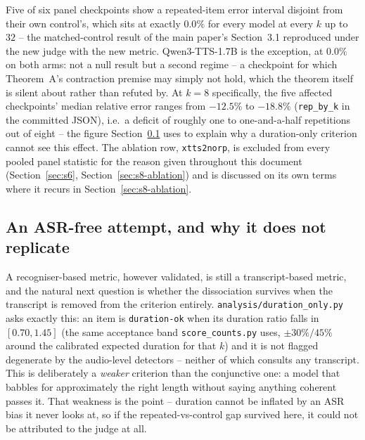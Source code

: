 \documentclass[11pt]{article}
\begin{document}
Five of six panel checkpoints show a repeated-item error interval disjoint
from their own control's, which sits at exactly $0.0\%$ for every model at
every $k$ up to $32$ -- the matched-control result of the main paper's
Section~3.1 reproduced under the new judge with the new metric. Qwen3-TTS-1.7B
is the exception, at $0.0\%$ on both arms: not a null result but a second
regime -- a checkpoint for which
Theorem~A's contraction premise may simply not hold, which the theorem
itself is silent about rather than refuted by. At $k{=}8$ specifically, the
five affected checkpoints' median relative error ranges from $-12.5\%$ to
$-18.8\%$ (\texttt{rep\_by\_k} in the committed JSON), i.e.\ a deficit of
roughly one to one-and-a-half repetitions out of eight -- the figure
Section~\ref{sec:s9-duration} uses to explain why a duration-only criterion
cannot see this effect. The ablation row, \texttt{xtts2norp}, is excluded
from every pooled panel statistic for the reason given throughout this
document (Section~\ref{sec:s6}, Section~\ref{sec:s8-ablation}) and is
discussed on its own terms where it recurs in Section~\ref{sec:s8-ablation}.

\subsection{An ASR-free attempt, and why it does not replicate}
\label{sec:s9-duration}

A recogniser-based metric, however validated, is still a transcript-based
metric, and the natural next question is whether the dissociation survives
when the transcript is removed from the criterion entirely.
\texttt{analysis/duration\_only.py} asks exactly this: an item is
\texttt{duration-ok} when its duration ratio falls in $[0.70, 1.45]$ (the
same acceptance band \texttt{score\_counts.py} uses, $\pm30\%/45\%$ around
the calibrated expected duration for that $k$) and it is not flagged
degenerate by the audio-level detectors -- neither of which consults any
transcript. This is deliberately a \emph{weaker} criterion than the
conjunctive one: a model that babbles for approximately the right length
without saying anything coherent passes it. That weakness is the point --
duration cannot be inflated by an ASR bias it never looks at, so if the
repeated-vs-control gap survived here, it could not be attributed to the
judge at all.
\end{document}
